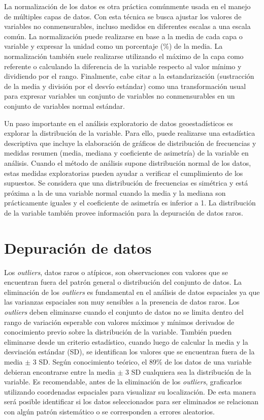 \documentclass[11pt,b5paper,]{krantz}
\begin{document}
La normalización de los datos es otra práctica comúnmente usada en el manejo de múltiples capas de datos. Con esta técnica se busca ajustar los valores de variables no conmensurables, incluso medidos en diferentes escalas a una escala común. La normalización puede realizarse en base a la media de cada capa o variable y expresar la unidad como un porcentaje (\%) de la media. La normalización también suele realizarse utilizando el máximo de la capa como referente o calculando la diferencia de la variable respecto al valor mínimo y dividiendo por el rango. Finalmente, cabe citar a la estandarización (sustracción de la media y división por el desvío estándar) como una transformación usual para expresar variables un conjunto de variables no conmensurables en un conjunto de variables normal estándar.

Un paso importante en el análisis exploratorio de datos geoestadísticos es explorar la distribución de la variable. Para ello, puede realizarse una estadística descriptiva que incluye la elaboración de gráficos de distribución de frecuencias y medidas resumen (media, mediana y coeficiente de asimetría) de la variable en análisis. Cuando el método de análisis supone distribución normal de los datos, estas medidas exploratorias pueden ayudar a verificar el cumplimiento de los supuestos. Se considera que una distribución de frecuencias es simétrica y está próxima a la de una variable normal cuando la media y la mediana son prácticamente iguales y el coeficiente de asimetría es inferior a 1. La distribución de la variable también provee información para la depuración de datos raros.

\hypertarget{depuraciuxf3n-de-datos}{%
\section{Depuración de datos}\label{depuraciuxf3n-de-datos}}

Los \emph{outliers}, datos raros o atípicos, son observaciones con valores que se encuentran fuera del patrón general o distribución del conjunto de datos. La eliminación de los \emph{outliers} es fundamental en el análisis de datos espaciales ya que las varianzas espaciales son muy sensibles a la presencia de datos raros. Los \emph{outliers} deben eliminarse cuando el conjunto de datos no se limita dentro del rango de variación esperable con valores máximos y mínimos derivados de conocimiento previo sobre la distribución de la variable. También pueden eliminarse desde un criterio estadístico, cuando luego de calcular la media y la desviación estándar (SD), se identifican los valores que se encuentran fuera de la media \(\pm\) 3 SD. Según conocimiento teórico, el 89\% de los datos de una variable debieran encontrarse entre la media \(\pm\) 3 SD cualquiera sea la distribución de la variable. Es recomendable, antes de la eliminación de los \emph{outliers}, graficarlos utilizando coordenadas espaciales para visualizar su localización. De esta manera será posible identificar si los datos seleccionados para ser eliminados se relacionan con algún patrón sistemático o se corresponden a errores aleatorios.
\end{document}
